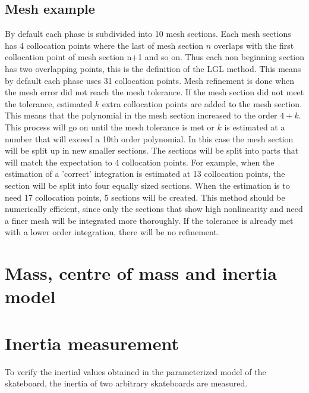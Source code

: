 \subsection*{Mesh example}
 By default each phase is subdivided into 10 mesh sections. Each mesh sections has 4 collocation points where the last of mesh section $n$ overlaps with the first collocation point of mesh section n+1 and so on. Thus each non beginning section has two overlapping points, this is the definition of the LGL method. This means by default each phase uses 31 collocation points. Mesh refinement is done when the mesh error did not reach the mesh tolerance. If the mesh section did not meet the tolerance, estimated $k$ extra collocation points are added to the mesh section. This means that the polynomial in the mesh section increased to the order $4+k$. This process will go on until the mesh tolerance is met or $k$ is estimated at a number that will exceed a 10th order polynomial. In this case the mesh section will be split up in new smaller sections. The sections will be split into parts that will match the expectation to 4 collocation points. For example, when the estimation of a 'correct' integration is estimated at 13 collocation points, the section will be split into four equally sized sections. When the estimation is to need 17 collocation points, 5 sections will be created. This method should be numerically efficient, since only the sections that show high nonlinearity and need a finer mesh will be integrated more thoroughly. If the tolerance is already met with a lower order integration, there will be no refinement\cite{rao_survey_2010,brockie_predictive_nodate,fasano_space_2016}. 

\section*{Mass, centre of mass and inertia model}


\section*{Inertia measurement}
To verify the inertial values obtained in the parameterized model of the skateboard, the inertia of two arbitrary skateboards are measured. 
